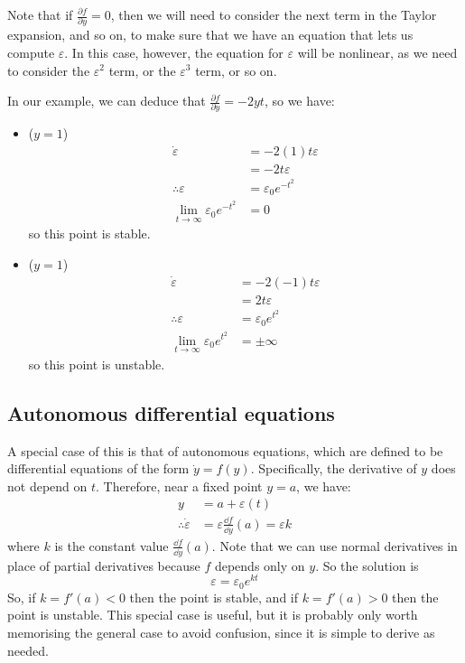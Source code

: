 Note that if \(\frac{\partial f}{\partial y} = 0\), then we will need to consider the next term in the Taylor expansion, and so on, to make sure that we have an equation that lets us compute \(\varepsilon\).
In this case, however, the equation for \(\varepsilon\) will be nonlinear, as we need to consider the \(\varepsilon^2\) term, or the \(\varepsilon^3\) term, or so on.

In our example, we can deduce that \(\frac{\partial f}{\partial y} = -2yt\), so we have:
\begin{itemize}
	\item (\(y = 1\)) \begin{align*}
		      \dot \varepsilon                           & = -2(1)t \varepsilon     \\
		                                                 & = -2t\varepsilon         \\
		      \therefore \varepsilon                     & = \varepsilon_0 e^{-t^2} \\
		      \lim_{t \to \infty} \varepsilon_0 e^{-t^2} & = 0
	      \end{align*}
	      so this point is stable.
	\item (\(y = 1\)) \begin{align*}
		      \dot \varepsilon                          & = -2(-1)t \varepsilon   \\
		                                                & = 2t\varepsilon         \\
		      \therefore \varepsilon                    & = \varepsilon_0 e^{t^2} \\
		      \lim_{t \to \infty} \varepsilon_0 e^{t^2} & = \pm\infty
	      \end{align*}
	      so this point is unstable.
\end{itemize}

\subsection{Autonomous differential equations}
A special case of this is that of autonomous equations, which are defined to be differential equations of the form \(\dot y = f(y)\).
Specifically, the derivative of \(y\) does not depend on \(t\).
Therefore, near a fixed point \(y=a\), we have:
\begin{align*}
	y                         & = a + \varepsilon(t)                                   \\
	\therefore\dot\varepsilon & = \varepsilon \frac{\dd{f}}{\dd{y}}(a) = \varepsilon k
\end{align*}
where \(k\) is the constant value \(\frac{\dd{f}}{\dd{y}}(a)\).
Note that we can use normal derivatives in place of partial derivatives because \(f\) depends only on \(y\).
So the solution is
\[
	\varepsilon = \varepsilon_0 e^{kt}
\]
So, if \(k = f'(a) < 0\) then the point is stable, and if \(k = f'(a) > 0\) then the point is unstable.
This special case is useful, but it is probably only worth memorising the general case to avoid confusion, since it is simple to derive as needed.
